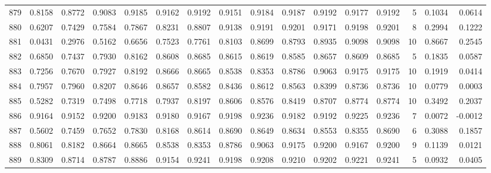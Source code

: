 \begin{tabular}{lrrrrrrrrrrrrrrr}
879 &      0.8158 &  0.8772 &  0.9083 &  0.9185 &  0.9162 &  0.9192 &  0.9151 &  0.9184 &  0.9187 &  0.9192 &   0.9177 &     0.9192 &      5 &                    0.1034 &                     0.0614 \\
880 &      0.6207 &  0.7429 &  0.7584 &  0.7867 &  0.8231 &  0.8807 &  0.9138 &  0.9191 &  0.9201 &  0.9171 &   0.9198 &     0.9201 &      8 &                    0.2994 &                     0.1222 \\
881 &      0.0431 &  0.2976 &  0.5162 &  0.6656 &  0.7523 &  0.7761 &  0.8103 &  0.8699 &  0.8793 &  0.8935 &   0.9098 &     0.9098 &     10 &                    0.8667 &                     0.2545 \\
882 &      0.6850 &  0.7437 &  0.7930 &  0.8162 &  0.8608 &  0.8685 &  0.8615 &  0.8619 &  0.8585 &  0.8657 &   0.8609 &     0.8685 &      5 &                    0.1835 &                     0.0587 \\
883 &      0.7256 &  0.7670 &  0.7927 &  0.8192 &  0.8666 &  0.8665 &  0.8538 &  0.8353 &  0.8786 &  0.9063 &   0.9175 &     0.9175 &     10 &                    0.1919 &                     0.0414 \\
884 &      0.7957 &  0.7960 &  0.8207 &  0.8646 &  0.8657 &  0.8582 &  0.8436 &  0.8612 &  0.8563 &  0.8399 &   0.8736 &     0.8736 &     10 &                    0.0779 &                     0.0003 \\
885 &      0.5282 &  0.7319 &  0.7498 &  0.7718 &  0.7937 &  0.8197 &  0.8606 &  0.8576 &  0.8419 &  0.8707 &   0.8774 &     0.8774 &     10 &                    0.3492 &                     0.2037 \\
886 &      0.9164 &  0.9152 &  0.9200 &  0.9183 &  0.9180 &  0.9167 &  0.9198 &  0.9236 &  0.9182 &  0.9192 &   0.9225 &     0.9236 &      7 &                    0.0072 &                    -0.0012 \\
887 &      0.5602 &  0.7459 &  0.7652 &  0.7830 &  0.8168 &  0.8614 &  0.8690 &  0.8649 &  0.8634 &  0.8553 &   0.8355 &     0.8690 &      6 &                    0.3088 &                     0.1857 \\
888 &      0.8061 &  0.8182 &  0.8664 &  0.8665 &  0.8538 &  0.8353 &  0.8786 &  0.9063 &  0.9175 &  0.9200 &   0.9167 &     0.9200 &      9 &                    0.1139 &                     0.0121 \\
889 &      0.8309 &  0.8714 &  0.8787 &  0.8886 &  0.9154 &  0.9241 &  0.9198 &  0.9208 &  0.9210 &  0.9202 &   0.9221 &     0.9241 &      5 &                    0.0932 &                     0.0405 \\

\end{tabular}
